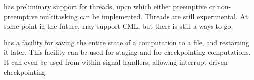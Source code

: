 \begin{description}
\begin{description}
{\mlton} has preliminary support for threads, upon which either
preemptive or non-preemptive multitasking can be implemented.  Threads
are still experimental.  At some point in the future, {\mlton} may
support CML, but there is still a ways to go.

{\mlton} has a facility for saving the entire state of a computation
to a file, and restarting it later.  This facility can be used for
staging and for checkpointing computations.  It can even be used from
within signal handlers, allowing interrupt driven checkpointing.

\end{description}
\end{description}

